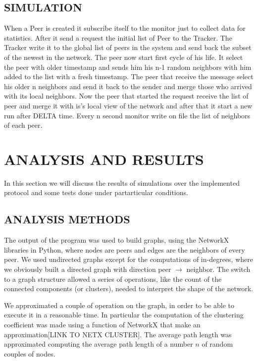 \documentclass[a4paper,12pt,notitlepage]{article} %
\begin{document}
\subsection{SIMULATION}
	When a Peer is created it subscribe itself to the monitor just to collect data for statistics. After it send a 
request the initial list of Peer to the Tracker. The Tracker write it to the global list of peers in the system and send 
back the subset of the newest in the network. The peer now start first cycle of his life. It select the peer with older 
timestamp and sends him his n-1 random neighbors with him added to the list with a fresh timestamp. The peer that receive 
the message select his older n neighbors and send it back to the sender and merge those who arrived with its local 
neighbors. Now the peer that started the request receive the list of peer and merge it with is's local view of the network 
and after that it start a new run after DELTA time. Every n second monitor write on file the list of neighbors of each 
peer.





\section{ANALYSIS AND RESULTS}

In this section we will discuss the results of simulations over the implemented protocol and some tests done under
 partarticular conditions.

\subsection{ANALYSIS METHODS}

The output of the program was used to build  graphs, using the NetworkX libraries\cite{netwx} in Python, where
 nodes are peers and edges are the neighbors of every peer. We used undirected graphs except for the 
 computations of in-degrees, where we obviously built a directed graph with direction peer \(\rightarrow\) neighbor.
 The switch to a graph structure allowed a series of operations, like the count of the connected components (or clusters), 
 needed to interpret the shape of the network.

We approximated a couple of operation on the graph, in order to be able to execute it in a reasonable time. In 
 particular the computation of the clustering coefficient was made using a function of NetworkX that make an 
approximation[LINK TO NETX CLUSTER]. The average path length was approximated computing the average path length of a number 
\(n\) of random couples of nodes.
\end{document}
